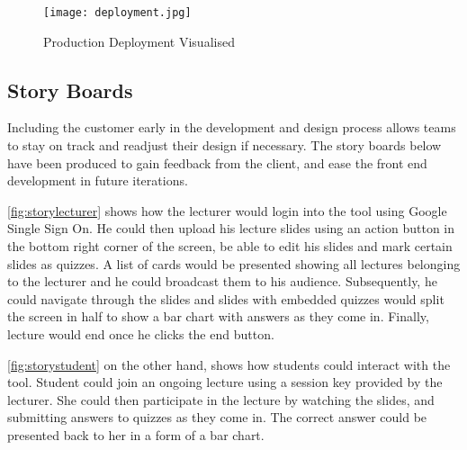 \begin{figure}[h!]
    \centering
    \texttt{[image: deployment.jpg]}
    \caption{Production Deployment Visualised}
    \label{fig:deploymentprocess}
\end{figure}

\subsection{Story Boards}
Including the customer
early in the development and design process allows teams to stay on track and readjust
their design if necessary. The story boards below have been produced to gain feedback
from the client, and ease the front end development in future iterations.

\autoref{fig:storylecturer} shows how the lecturer would login into the tool using
Google Single Sign On. He could then upload his lecture slides using an action
button in the bottom right corner of the screen, be able to edit his slides and
mark certain slides as quizzes. A list of cards would be presented showing all
lectures belonging to the lecturer and he could broadcast them to his audience.
Subsequently, he could navigate through the slides and slides with embedded quizzes would
split the screen in half to show a bar chart with answers as they come in. Finally,
lecture would end once he clicks the end button.

\autoref{fig:storystudent} on the other hand, shows how students could interact with
the tool. Student could join an ongoing lecture using a session key provided by the
lecturer. She could then participate in the lecture by watching the slides, and
submitting answers to quizzes as they come in. The correct answer could be presented
back to her in a form of a bar chart.

